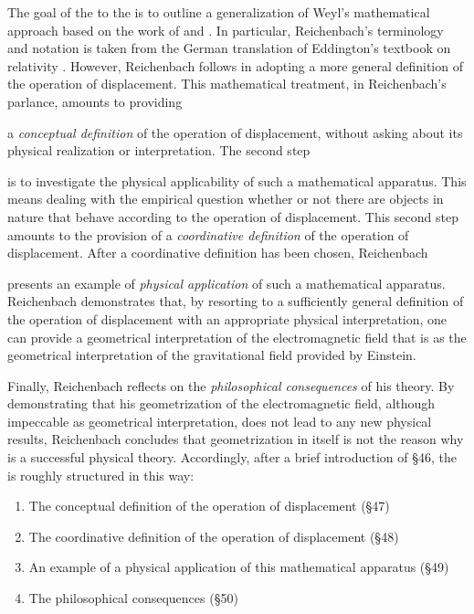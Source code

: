 \documentclass[final]{article}
\newcommand{\PRZL}{\citetitle{Reichenbach1928}\xspace}
\begin{document}
\begin{inparaenum}[(1)] The goal of the \Ap to the \PRZL is to outline a generalization of Weyl's mathematical approach based on the work of \citet{Eddington1923} and \citet{Schouten1922}. In particular, Reichenbach's terminology and notation is taken from the German translation \citep{Eddington1925a} of Eddington's textbook on relativity \citep{Eddington1923}. However, Reichenbach follows \citet{Schouten1922} in adopting a more general definition of the operation of displacement. This mathematical treatment, in Reichenbach's parlance, amounts to providing \item a \emph{conceptual definition} of the operation of displacement, without asking about its physical realization or interpretation. The second step \item is to investigate the physical applicability of such a mathematical apparatus. This means dealing with the empirical question whether or not there are objects in nature that behave according to the operation of displacement. This second step amounts to the provision of a \emph{coordinative definition} of the operation of displacement. After a coordinative definition has been chosen, Reichenbach \item presents an example of \emph{physical application} of such a mathematical apparatus. Reichenbach demonstrates that, by resorting to a sufficiently general definition of the operation of displacement with an appropriate physical interpretation, one can provide a geometrical interpretation of the electromagnetic field that is  as the geometrical interpretation of the gravitational field provided by Einstein. \item Finally, Reichenbach reflects on the \emph{philosophical consequences} of his theory. By demonstrating that his geometrization of the electromagnetic field, although impeccable as geometrical interpretation, does not lead to any new physical results, Reichenbach concludes that geometrization in itself is not the reason why \gr is a successful physical theory. Accordingly, after a brief introduction of \S46, the \Ap is roughly structured in this way: \end{inparaenum}

\begin{enumerate}
 \item The conceptual definition of the operation of displacement (\S47)
 \item The coordinative definition of the operation of displacement (\S 48)
 \item An example of a physical application of this mathematical apparatus (\S49)
 \item The philosophical consequences (\S50)
\end{enumerate}
\end{document}
